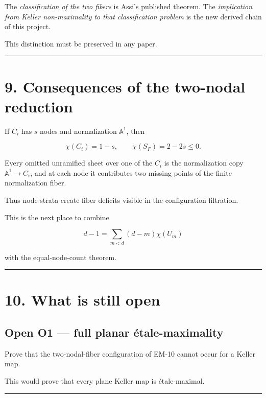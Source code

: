 The \emph{classification of the two fibers} is Assi's published theorem.
The \emph{implication from Keller non-maximality to that classification
problem} is the new derived chain of this project.

This distinction must be preserved in any paper.

\begin{center}\rule{0.5\linewidth}{0.5pt}\end{center}

\section{9. Consequences of the two-nodal
reduction}\label{consequences-of-the-two-nodal-reduction}

If \(C_i\) has \(s\) nodes and normalization \(\mathbb A^1\), then

\[
\chi(C_i)=1-s,
\qquad
\chi(S_F)=2-2s\le0.
\]

Every omitted unramified sheet over one of the \(C_i\) is the
normalization copy \(\mathbb A^1\to C_i\), and at each node it
contributes two missing points of the finite normalization fiber.

Thus node strata create fiber deficits visible in the configuration
filtration.

This is the next place to combine

\[
d-1=\sum_{m<d}(d-m)\chi(U_m)
\]

with the equal-node-count theorem.

\begin{center}\rule{0.5\linewidth}{0.5pt}\end{center}

\section{10. What is still open}\label{what-is-still-open}

\subsection{Open O1 --- full planar
étale-maximality}\label{open-o1-full-planar-uxe9tale-maximality}

Prove that the two-nodal-fiber configuration of EM-10 cannot occur for a
Keller map.

This would prove that every plane Keller map is étale-maximal.

\begin{center}\rule{0.5\linewidth}{0.5pt}\end{center}

